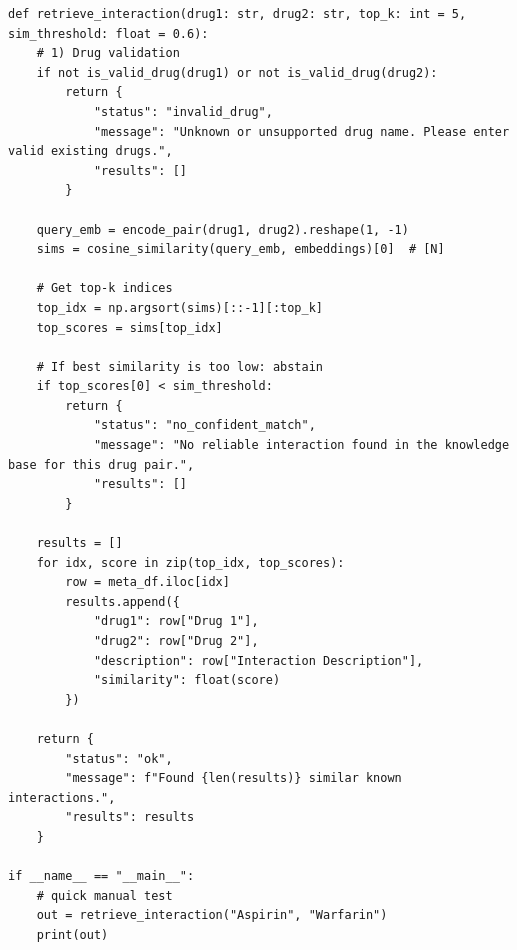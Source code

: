 \documentclass[12pt,a4paper]{article}
\begin{document}
\begin{lstlisting}
def retrieve_interaction(drug1: str, drug2: str, top_k: int = 5, sim_threshold: float = 0.6):
    # 1) Drug validation
    if not is_valid_drug(drug1) or not is_valid_drug(drug2):
        return {
            "status": "invalid_drug",
            "message": "Unknown or unsupported drug name. Please enter valid existing drugs.",
            "results": []
        }

    query_emb = encode_pair(drug1, drug2).reshape(1, -1)
    sims = cosine_similarity(query_emb, embeddings)[0]  # [N]

    # Get top-k indices
    top_idx = np.argsort(sims)[::-1][:top_k]
    top_scores = sims[top_idx]

    # If best similarity is too low: abstain
    if top_scores[0] < sim_threshold:
        return {
            "status": "no_confident_match",
            "message": "No reliable interaction found in the knowledge base for this drug pair.",
            "results": []
        }

    results = []
    for idx, score in zip(top_idx, top_scores):
        row = meta_df.iloc[idx]
        results.append({
            "drug1": row["Drug 1"],
            "drug2": row["Drug 2"],
            "description": row["Interaction Description"],
            "similarity": float(score)
        })

    return {
        "status": "ok",
        "message": f"Found {len(results)} similar known interactions.",
        "results": results
    }

if __name__ == "__main__":
    # quick manual test
    out = retrieve_interaction("Aspirin", "Warfarin")
    print(out)
\end{lstlisting}
\end{document}
